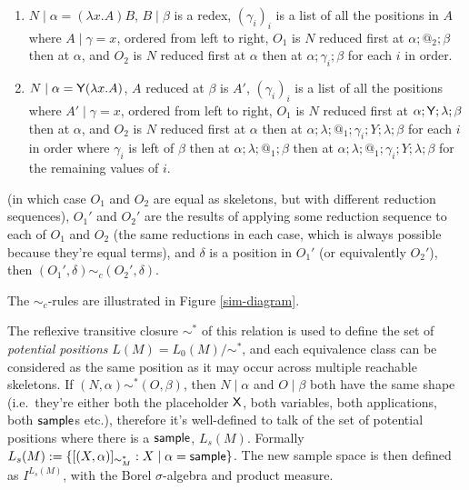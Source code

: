 \begin{definition}
\begin{enumerate}
\begin{enumerate}
        \item $N \mid \alpha = (\lambda x. A) B$, $B \mid \beta$ is a redex, $(\gamma_i)_i$ is a list of all the positions in $A$ where $A \mid \gamma = x$, ordered from left to right, $O_1$ is $N$ reduced first at $\alpha ; @_2 ; \beta$ then at $\alpha$, and $O_2$ is $N$ reduced first at $\alpha$ then at $\alpha;\gamma_i;\beta$ for each $i$ in order.
        
        \item $N \mid \alpha = \mathsf{Y} (\lambda x. A)$, $A$ reduced at $\beta$ is $A'$, $(\gamma_i)_i$ is a list of all the positions where $A' \mid \gamma  = x$, ordered from left to right, $O_1$ is $N$ reduced first at $\alpha;\mathsf{Y};\lambda;\beta$ then at $\alpha$, and $O_2$ is $N$ reduced first at $\alpha$ then at $\alpha;\lambda;@_1;\gamma_i;Y;\lambda;\beta$ for each $i$ in order where $\gamma_i$ is left of $\beta$ then at $\alpha;\lambda;@_1;\beta$ then at $\alpha;\lambda;@_1;\gamma_i;Y;\lambda;\beta$ for the remaining values of $i$.
    \end{enumerate}
    (in which case $O_1$ and $O_2$ are equal as skeletons, but with different reduction sequences), $O_1'$ and $O_2'$ are the results of applying some reduction sequence to each of $O_1$ and $O_2$ (the same reductions in each case, which is always possible because they're equal terms), and $\delta$ is a position in $O_1'$ (or equivalently $O_2'$), then $(O_1',\delta) \sim_c (O_2',\delta)$.
\end{enumerate}
The $\sim_c$-rules are illustrated in Figure \ref{sim-diagram}.
\end{definition}

The reflexive transitive closure $\sim^*$ of this relation is used to define the set of \emph{potential positions} $L(M) = L_0(M) / \sim^*$, and each equivalence class can be considered as the same position as it may occur across multiple reachable skeletons. 
If $(N,\alpha) \sim^* (O,\beta)$, then $N \mid \alpha$ and $O \mid \beta$ both have the same shape (i.e.~they're either both the placeholder $\mathsf{X}$, both variables, both applications, both $\mathsf{sample}$s etc.), therefore it's well-defined to talk of the set of potential positions where there is a $\mathsf{sample}$, $L_s(M)$. 
Formally $L_s(M) := \{[(X, \alpha)]_{\sim^\ast_M} : X \mid \alpha = \mathsf{sample}\}$.
The new sample space is then defined as $I^{L_s(M)}$, with the Borel $\sigma$-algebra and product measure.

